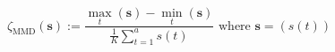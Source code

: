 \begin{equation}
	\zeta_\text{MMD}(\textbf{s}) := \frac{\max_t \left(\textbf{s}\right) - \min_t\left(\textbf{s}\right)}{\frac{1}{K}\sum_{t=1}^{a}s(t)}
	\text{ where } \textbf{s} = (s(t))
\label{ch1:equ:min-max-difference-definition}
\end{equation}